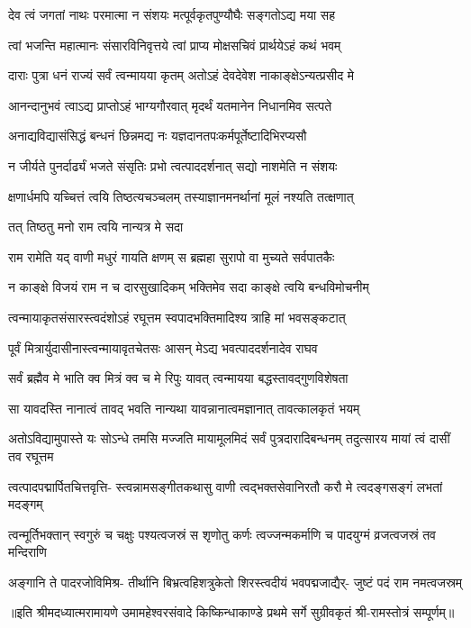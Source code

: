 

\addtocounter{shlokacount}{75}
\twolineshloka
{देव त्वं जगतां नाथः परमात्मा न संशयः}
{मत्पूर्वकृतपुण्यौघैः सङ्गतोऽद्य मया सह} %

\twolineshloka
{त्वां भजन्ति महात्मानः संसारविनिवृत्तये}
{त्वां प्राप्य मोक्षसचिवं प्रार्थयेऽहं कथं भवम्} %

\twolineshloka
{दाराः पुत्रा धनं राज्यं सर्वं त्वन्मायया कृतम्}
{अतोऽहं देवदेवेश नाकाङ्क्षेऽन्यत्प्रसीद मे} %

\twolineshloka
{आनन्दानुभवं त्वाऽद्य प्राप्तोऽहं भाग्यगौरवात्}
{मृदर्थं यतमानेन निधानमिव सत्पते} %

\twolineshloka
{अनाद्यविद्यासंसिद्धं बन्धनं छिन्नमद्य नः}
{यज्ञदानतपःकर्मपूर्तेष्टादिभिरप्यसौ} %

\twolineshloka
{न जीर्यते पुनर्दार्ढ्यं भजते संसृतिः प्रभो}
{त्वत्पाददर्शनात् सद्यो नाशमेति न संशयः} %

\twolineshloka
{क्षणार्धमपि यच्चित्तं त्वयि तिष्ठत्यचञ्चलम्}
{तस्याज्ञानमनर्थानां मूलं नश्यति तत्क्षणात्} %

\onelineshloka
{तत् तिष्ठतु मनो राम त्वयि नान्यत्र मे सदा} %

\twolineshloka
{राम रामेति यद् वाणी मधुरं गायति क्षणम्}
{स ब्रह्महा सुरापो वा मुच्यते सर्वपातकैः} %

\twolineshloka
{न काङ्क्षे विजयं राम न च दारसुखादिकम्}
{भक्तिमेव सदा काङ्क्षे त्वयि बन्धविमोचनीम्} %

\twolineshloka
{त्वन्मायाकृतसंसारस्त्वदंशोऽहं रघूत्तम}
{स्वपादभक्तिमादिश्य त्राहि मां भवसङ्कटात्} %

\twolineshloka
{पूर्वं मित्रार्युदासीनास्त्वन्मायावृतचेतसः}
{आसन् मेऽद्य भवत्पाददर्शनादेव राघव} %

\twolineshloka
{सर्वं ब्रह्मैव मे भाति क्व मित्रं क्व च मे रिपुः}
{यावत् त्वन्मायया बद्धस्तावद्गुणविशेषता} %

\twolineshloka
{सा यावदस्ति नानात्वं तावद् भवति नान्यथा}
{यावन्नानात्वमज्ञानात् तावत्कालकृतं भयम्} %

\threelineshloka
{अतोऽविद्यामुपास्ते यः सोऽन्धे तमसि मज्जति}
{मायामूलमिदं सर्वं पुत्रदारादिबन्धनम्}
{तदुत्सारय मायां त्वं दासीं तव रघूत्तम} %

\fourlineindentedshloka
{त्वत्पादपद्मार्पितचित्तवृत्ति-}
{स्त्वन्नामसङ्गीतकथासु वाणी}
{त्वद्भक्तसेवानिरतौ करौ मे}
{त्वदङ्गसङ्गं लभतां मदङ्गम्} %

\fourlineindentedshloka
{त्वन्मूर्तिभक्तान् स्वगुरुं च चक्षुः}
{पश्यत्वजस्रं स शृणोतु कर्णः}
{त्वज्जन्मकर्माणि च पादयुग्मं}
{व्रजत्वजस्रं तव मन्दिराणि} %

\fourlineindentedshloka
{अङ्गानि ते पादरजोविमिश्र-}
{तीर्थानि बिभ्रत्वहिशत्रुकेतो}
{शिरस्त्वदीयं भवपद्मजाद्यैर्-}
{जुष्टं पदं राम नमत्वजस्रम्} %

{॥इति श्रीमदध्यात्मरामायणे उमामहेश्वरसंवादे किष्किन्धाकाण्डे
प्रथमे सर्गे  सुग्रीवकृतं श्री-रामस्तोत्रं सम्पूर्णम्॥}
